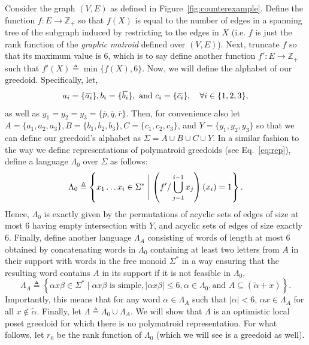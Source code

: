 \documentclass[11pt]{article}
\newcommand{\univ}{\Sigma}
\newcommand{\glang}{\Lambda}
\newcommand{\overbar}[1]{\mkern 1.5mu\overline{\mkern-1.5mu#1\mkern-1.5mu}\mkern 1.5mu}
\begin{document}
Consider the graph $(V, E)$ as defined in Figure~\ref{fig:counterexample}.
Define the function $f: E \to \mathbb{Z}_+$ so that $f(X)$ is equal to the number of edges in a spanning tree of the subgraph induced by restricting to the edges in $X$ (i.e. $f$ is just the rank function of the \emph{graphic matroid} defined over $(V,E)$).
Next, truncate $f$ so that its maximum value is 6, which is to say define another function $f':E\to\mathbb{Z}_+$ such that $f'(X) \triangleq \min\{f(X), 6\}$.
Now, we will define the alphabet of our greedoid.
Specifically, let,
\[
    a_i = \{\overbar{a_i}\}, b_i = \{\overbar{b_i}\},\text{ and } c_i = \{\overbar{c_i}\},\quad\forall i \in\{1,2,3\},
\]
as well as $y_1 = y_2 = y_3 = \{\overline{p},\overline{q},\overline{r}\}$.
Then, for convenience also let $A = \{a_1, a_2, a_3\}, B = \{b_1, b_2, b_3\}, C = \{c_1, c_2, c_3\}$, and $Y = \{y_1, y_2, y_3\}$ so that we can define our greedoid's alphabet as $\univ = A\cup B\cup C\cup Y$.
In a similar fashion to the way we define representations of polymatroid greedoids (see Eq.~\ref{eq:rep}), define a language $\glang_0$ over $\univ$ as follows:
\[
    \glang_0 \triangleq \left\{x_1\ldots x_i \in \univ^*\Biggm\vert \left(f'/\bigcup_{j=1}^{i-1}x_j\right)(x_i) = 1\right\}.
\]
Hence, $\glang_0$ is exactly given by the permutations of acyclic sets of edges of size at most 6 having empty intersection with $Y$, and acyclic sets of edges of size exactly 6.
Finally, define another language $\glang_A$ consisting of words of length at most 6 obtained by concatenating words in $\glang_0$ containing at least two letters from $A$ in their support with words in the free monoid $\univ^*$ in a way ensuring that the resulting word contains $A$ in its support if it is not feasible in $\glang_0$,
\[
    \glang_A \triangleq \left\{\alpha x\beta \in\univ^*\mid \alpha x \beta\text{ is simple},|\alpha x\beta|\leq 6, \alpha \in \glang_0,\text{and }A\subseteq(\widetilde{\alpha} + x)\right\}.
\]
Importantly, this means that for any word $\alpha \in \glang_A$ such that $|\alpha| < 6$, $\alpha x \in \glang_A$ for all $x \notin\widetilde{\alpha}$.
Finally, let $\glang \triangleq \glang_0 \cup \glang_A$.
We will show that $\glang$ is an optimistic local poset greedoid for which there is no polymatroid representation.
For what follows, let $r_0$ be the rank function of $\glang_0$ (which we will see is a greedoid as well).
\end{document}
